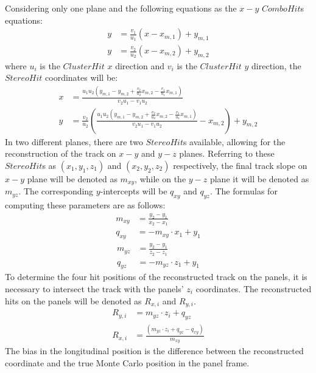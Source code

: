 Considering only one plane and the following 
equations as the $x-y$ $ComboHit$s equations:
\begin{equation}
    \begin{aligned}
        y&=\frac{v_1}{u_1}(x-x_{m,1})+y_{m,1} \\
        y&=\frac{v_2}{u_2}(x-x_{m,2})+y_{m,2} 
    \end{aligned}
    \end{equation}
where $u_i$ is the $ClusterHit$ $x$ direction and $v_i$ is the $ClusterHit$ $y$ direction, the $StereoHit$ coordinates will be:
\begin{equation}\label{x}
    \begin{aligned}
x&=\frac{u_1 u_2(y_{m,1}-y_{m,2}+\frac{v_2}{u_2}x_{m,2}-\frac{v_1}{u_1}x_{m,1})}{v_2 u_1 - v_1 u_2}\\
y&=\frac{v_2}{u_2}\left(\frac{u_1 u_2(y_{m,1}-y_{m,2}+\frac{v_2}{u_2}x_{m,2}-\frac{v_1}{u_1}x_{m,1})}{v_2 u_1 - v_1 u_2}-x_{m,2}\right)+y_{m,2}
\end{aligned}
\end{equation}
In two different planes, there are two $StereoHit$s available, allowing for the reconstruction of the track on $x-y$ and $y-z$ planes. 
Referring to these $StereoHit$s as $(x_1,y_1,z_1)$ and $(x_2,y_2,z_2)$ respectively, the final track slope on $x-y$ plane will be 
denoted as $m_{xy}$, while on the $y-z$ plane it will be denoted as $m_{yz}$. The corresponding $y$-intercepts will be $q_{xy}$ and $q_{yz}$.
The formulas for computing these parameters are as follows:
\begin{equation}
    \begin{aligned}
m_{xy}&=\frac{y_2-y_1}{x_2-x_1}\\
q_{xy}&=-m_{xy} \cdot x_1+y_1
\end{aligned}
\end{equation}
\begin{equation}
    \begin{aligned}
m_{yz}&=\frac{y_2-y_1}{z_2-z_1}\\
q_{yz}&=-m_{yz} \cdot z_1+y_1
\end{aligned}
\end{equation}
To determine the four hit positions of the reconstructed track on the panels, it is necessary to intersect the track with the panels' $z_i$ coordinates. 
The reconstructed hits on the panels will be denoted as $R_{x,i}$ and $R_{y,i}$.
\begin{equation}
    \begin{aligned}
 R_{y,i}&=m_{yz}\cdot z_i+q_{yz}\\
 R_{x,i}&=\frac{(m_{yz}\cdot z_i+q_{yz}-q_{xy})}{m_{xy}}
\end{aligned}
\end{equation}
The bias in the longitudinal position is the difference between the reconstructed coordinate and the true Monte Carlo position in the panel frame.

